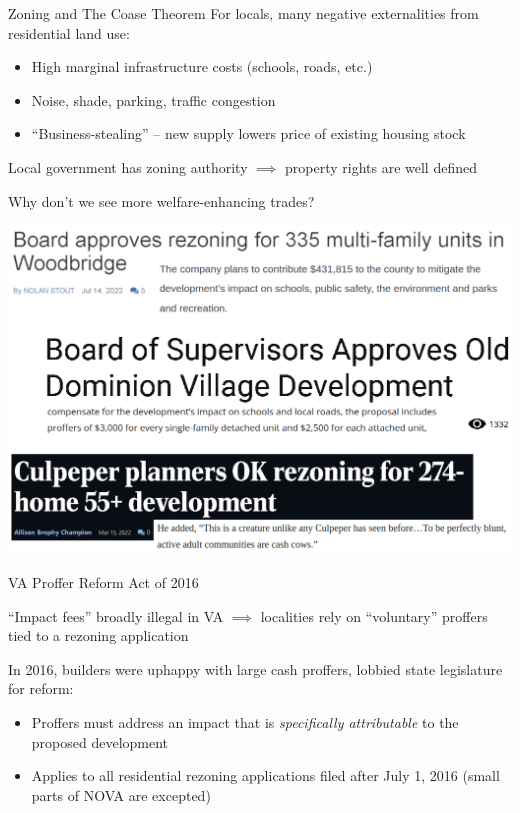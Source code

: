 \documentclass[10pt]{beamer}
\begin{document}
\begin{frame}{Zoning and The Coase Theorem}
    For locals, many negative externalities from residential land use:
    \begin{itemize}
        \item High marginal infrastructure costs (schools, roads, etc.)
        \item Noise, shade, parking, traffic congestion
        \item ``Business-stealing'' -- new supply lowers price of existing housing stock
    \end{itemize}
    \vspace{2em}
    Local government has zoning authority $\implies$ property rights are well defined

    \vspace{2em}
    Why don't we see more welfare-enhancing trades?
\end{frame}


\begin{frame}
    \includegraphics[width=\textwidth]{figures/images/20230312 Rezoning News VA.png}
\end{frame}

\begin{frame}{VA Proffer Reform Act of 2016}

``Impact fees'' broadly illegal in VA $\implies$ localities rely on ``voluntary'' proffers tied to a rezoning application
\vspace{2em}

In 2016, builders were uphappy with large cash proffers, lobbied state legislature for reform:
\begin{itemize}
    \item Proffers must address an impact that is \textit{specifically attributable} to the proposed development
    \item Applies to all residential rezoning applications filed after July 1, 2016 (small parts of NOVA are excepted)
\end{itemize}
\end{frame}
\end{document}
